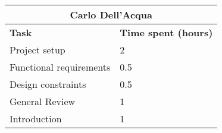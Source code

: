 \begin{table}[h]
  \center
  \begin{tabular}{l|l}
    \multicolumn{2}{c}{\textbf{Carlo Dell'Acqua}} \\
    \hline
    \textbf{Task} & \textbf{Time spent (hours)}\\
    \hline
    Project setup & 2 \\
    Functional requirements & 0.5 \\
    Design constraints & 0.5 \\
    General Review & 1 \\
    Introduction & 1
  \end{tabular}
\end{table}